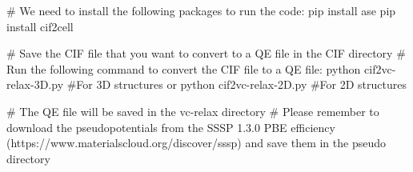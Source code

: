# We need to install the following packages to run the code:
pip install ase
pip install cif2cell

# Save the CIF file that you want to convert to a QE file in the CIF directory
# Run the following command to convert the CIF file to a QE file:
python cif2vc-relax-3D.py  #For 3D structures
or
python cif2vc-relax-2D.py  #For 2D structures

# The QE file will be saved in the vc-relax directory
# Please remember to download the pseudopotentials from the SSSP 1.3.0 PBE efficiency (https://www.materialscloud.org/discover/sssp) and save them in the pseudo directory